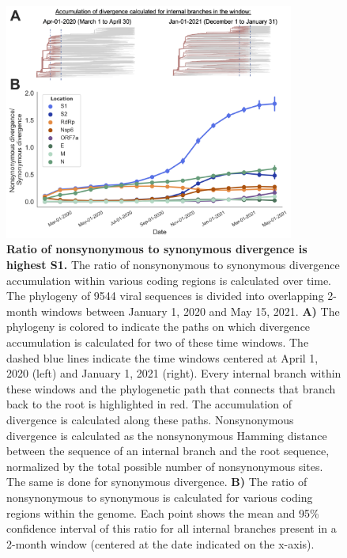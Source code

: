\documentclass[11pt,oneside,letterpaper]{article}
\begin{document}
\begin{figure}[h!]
	\centerline{\includegraphics[width=0.85\textwidth]{fig2_dnds.png}}
	\caption{\textbf{Ratio of nonsynonymous to synonymous divergence is highest S1.}
	The ratio of nonsynonymous to synonymous divergence accumulation within various coding regions is calculated over time.
	The phylogeny of 9544 viral sequences is divided into overlapping 2-month windows between January 1, 2020 and May 15, 2021.
	\textbf{A)} The phylogeny is colored to indicate the paths on which divergence accumulation is calculated for two of these time windows. 
	The dashed blue lines indicate the time windows centered at April 1, 2020 (left) and January 1, 2021 (right). 
	Every internal branch within these windows and the phylogenetic path that connects that branch back to the root is highlighted in red.
	The accumulation of divergence is calculated along these paths.
	Nonsynonymous divergence is calculated as the nonsynonymous Hamming distance between the sequence of an internal branch and the root sequence, normalized by the total possible number of nonsynonymous sites.
	The same is done for synonymous divergence.
	\textbf{B)} The ratio of nonsynonymous to synonymous is calculated for various coding regions within the genome. 
	Each point shows the mean and 95\% confidence interval of this ratio for all internal branches present in a 2-month window (centered at the date indicated on the x-axis).
	}
	\label{fig:dnds}
\end{figure}
\end{document}
